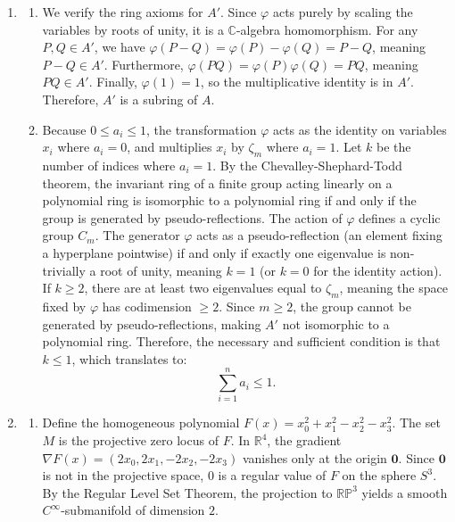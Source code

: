 \documentclass[10pt,a4paper]{article}
\begin{document}
\begin{enumerate}[label=\fbox{\arabic*}]
  \item %
        \begin{enumerate}[label=(\arabic*)]
          \item We verify the ring axioms for $A'$. Since $\varphi$ acts purely by scaling the variables by roots of unity, it is a $\mathbb{C}$-algebra homomorphism. For any $P, Q \in A'$, we have $\varphi(P - Q) = \varphi(P) - \varphi(Q) = P - Q$, meaning $P - Q \in A'$. Furthermore, $\varphi(PQ) = \varphi(P)\varphi(Q) = PQ$, meaning $PQ \in A'$. Finally, $\varphi(1) = 1$, so the multiplicative identity is in $A'$. Therefore, $A'$ is a subring of $A$.

          \item Because $0 \le a_i \le 1$, the transformation $\varphi$ acts as the identity on variables $x_i$ where $a_i = 0$, and multiplies $x_i$ by $\zeta_m$ where $a_i = 1$. Let $k$ be the number of indices where $a_i = 1$. By the Chevalley-Shephard-Todd theorem, the invariant ring of a finite group acting linearly on a polynomial ring is isomorphic to a polynomial ring if and only if the group is generated by pseudo-reflections. 
          The action of $\varphi$ defines a cyclic group $C_m$. The generator $\varphi$ acts as a pseudo-reflection (an element fixing a hyperplane pointwise) if and only if exactly one eigenvalue is non-trivially a root of unity, meaning $k = 1$ (or $k=0$ for the identity action). 
          If $k \ge 2$, there are at least two eigenvalues equal to $\zeta_m$, meaning the space fixed by $\varphi$ has codimension $\ge 2$. Since $m \ge 2$, the group cannot be generated by pseudo-reflections, making $A'$ not isomorphic to a polynomial ring. 
          Therefore, the necessary and sufficient condition is that $k \le 1$, which translates to:
          \[
            \sum_{i=1}^n a_i \le 1.
          \]
        \end{enumerate}

  \item %
        \begin{enumerate}[label=(\arabic*)]
          \item Define the homogeneous polynomial $F(x) = x_0^2 + x_1^2 - x_2^2 - x_3^2$. The set $M$ is the projective zero locus of $F$. In $\mathbb{R}^4$, the gradient $\nabla F(x) = (2x_0, 2x_1, -2x_2, -2x_3)$ vanishes only at the origin $\mathbf{0}$. Since $\mathbf{0}$ is not in the projective space, $0$ is a regular value of $F$ on the sphere $S^3$. By the Regular Level Set Theorem, the projection to $\mathbb{RP}^3$ yields a smooth $C^\infty$-submanifold of dimension $2$.


\end{enumerate}
\end{enumerate}
\end{document}
